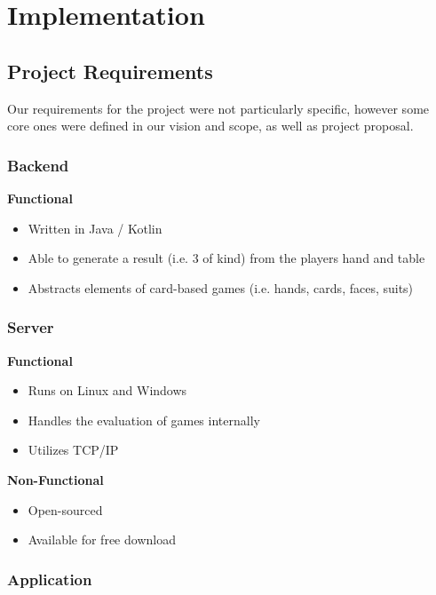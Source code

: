 \documentclass[11pt]{article}
\begin{document}
\newpage
\section{Implementation}

\subsection{Project Requirements}
Our requirements for the project were not particularly specific, however some core ones were defined in our vision and scope, as well as project proposal. 

\subsubsection{Backend}
\textbf{Functional}
\begin{itemize}
	\item Written in Java / Kotlin
	\item Able to generate a result (i.e. 3 of kind) from the players hand and table
	\item Abstracts elements of card-based games (i.e. hands, cards, faces, suits)
\end{itemize}

\subsubsection{Server}
\textbf{Functional}
\begin{itemize}
	\item Runs on Linux and Windows
	\item Handles the evaluation of games internally
	\item Utilizes TCP/IP
\end{itemize}

\textbf{Non-Functional}
\begin{itemize}
	\item Open-sourced
	\item Available for free download
\end{itemize}

\subsubsection{Application}
\end{document}
